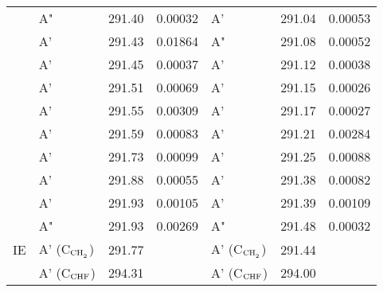 \documentclass[journal=jctcce,manuscript=article]{achemso}
\begin{document}
\begin{table}[H]
\begin{tabular}{l|lcc|lcc}
& A" & 291.40 & 0.00032	& A' & 291.04 & 0.00053 \\
& A' & 291.43 & 0.01864	& A" & 291.08 & 0.00052 \\
& A' & 291.45 & 0.00037	& A' & 291.12 & 0.00038 \\
& A' & 291.51 & 0.00069	& A' & 291.15 & 0.00026 \\
& A' & 291.55 & 0.00309	& A' & 291.17 & 0.00027 \\
& A' & 291.59 & 0.00083	& A' & 291.21 & 0.00284 \\
& A' & 291.73 & 0.00099	& A' & 291.25 & 0.00088 \\
& A' & 291.88 & 0.00055	& A' & 291.38 & 0.00082 \\
& A' & 291.93 & 0.00105	& A' & 291.39 & 0.00109 \\
& A" & 291.93 & 0.00269	& A" & 291.48 & 0.00032 \\
\hline
IE & A' (C$_{\ce{CH2}}$) & 291.77& 
   & A' (C$_{\ce{CH2}}$) & 291.44 &  \\
   & A' (C$_{\ce{CHF}}$) & 294.31& 
   & A' (C$_{\ce{CHF}}$) & 294.00 &  \\
\hline
\end{tabular}
\end{table}
%
\end{document}

